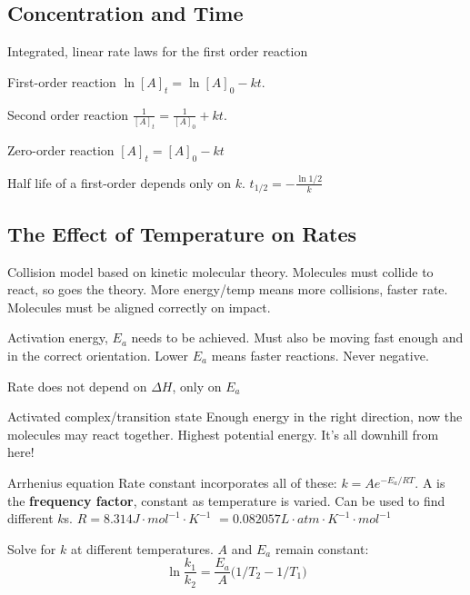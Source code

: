 \begin{mdframed}
\subsection{Concentration and Time}
\begin{multicols}{2}
    Integrated, linear rate laws for the first order reaction 
\begin{compactdesc}
    \item[First-order reaction]
        $\ln [A]_t = \ln [A]_0 - kt$.
    \item[Second order reaction]
        $\frac{1}{[A]_t} = \frac {1} {[A]_0} + kt$.
    \item[Zero-order reaction] $[A]_t = [A]_0 - kt$
    \item[Half life] of a first-order depends only on $k$. $t_{1/2} = -\frac{\ln 1/2} {k}$
\end{compactdesc}
\end{multicols}
\end{mdframed}





\begin{mdframed}\subsection{The Effect of Temperature on Rates}
\begin{multicols}{2}
\begin{compactdesc}
    \item[Collision model] based on kinetic molecular theory. Molecules
        must collide to react, so goes the theory. More energy/temp means
        more collisions, faster rate. Molecules must be aligned correctly on impact.
    \item[Activation energy, $E_a$] needs to be achieved.
        Must also be moving fast enough and in the correct orientation.
        Lower $E_a$ means faster reactions.
        Never negative.
    \item[Rate does not depend on] $\Delta H$, only on $E_a$
    \item[Activated complex/transition state] Enough energy in the right
        direction, now the molecules may react together.
        Highest potential energy. It's all downhill from here!
    \item[Arrhenius equation] Rate constant incorporates all of these:
        $k = Ae^{-E_a / RT}$. A is the \textbf{frequency factor}, constant as
        temperature is varied. Can be used to find different $k$s.
        $R = 8.314 J \cdot mol^{-1} \cdot K^{-1} $
        $= 0.082057L \cdot atm \cdot K^{-1}\cdot mol^{-1}$
    \item[Solve for $k$] at different temperatures. $A$ and $E_a$ remain
        constant:
        \[
            \ln \frac{k_1}{k_2} = \frac{E_a}{A} \big( 1/T_2 - 1/T_1 \big)
        \]
\end{compactdesc}
\end{multicols}
\end{mdframed}



